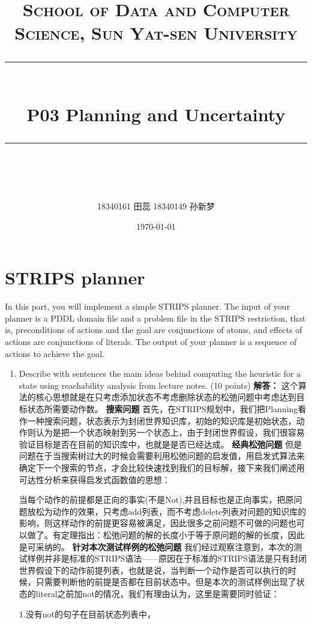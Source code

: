\documentclass[a4paper, 11pt]{article}
\title{	
\normalfont \normalsize
\textsc{School of Data and Computer Science, Sun Yat-sen University} \\ [25pt] %
\rule{\textwidth}{0.5pt} \\[0.4cm] %
\huge  P03 Planning and Uncertainty\\ %
\rule{\textwidth}{2pt} \\[0.5cm] %
\author{18340161 田蕊 18340149 孙新梦}
\date{\normalsize\today}
}
\begin{document}
\maketitle
\tableofcontents
\newpage
\section{STRIPS planner}
In this part, you will implement a simple STRIPS planner. The input of your planner is a PDDL domain file and a problem file in the STRIPS restriction, that is, preconditions of actions and the goal are conjunctions of atoms, and effects of actions are conjunctions of literals. The output of your planner is a sequence of actions to achieve the goal.

\begin{enumerate}

\item Describe with sentences the main ideas behind computing the heuristic for a state using reachability analysis from lecture notes. (10 points)
	\newline\textbf{解答：}
	这个算法的核心思想就是在只考虑添加状态不考虑删除状态的松弛问题中考虑达到目标状态所需要动作数。
	\newline\textbf{搜索问题}
    首先，在STRIPS规划中，我们把Planning看作一种搜索问题，状态表示为封闭世界知识库，初始的知识库是初始状态，动作则认为是把一个状态映射到另一个状态上，由于封闭世界假设，我们很容易验证目标是否在目前的知识库中，也就是是否已经达成。
    \newline\textbf{经典松弛问题}
    但是问题在于当搜索树过大的时候会需要利用松弛问题的启发值，用启发式算法来确定下一个搜索的节点，才会比较快速找到我们的目标解，接下来我们阐述用可达性分析来获得启发式函数值的思想：
    
    当每个动作的前提都是正向的事实(不是Not),并且目标也是正向事实，把原问题放松为动作的效果，只考虑add列表，而不考虑delete列表对问题的知识库的影响，则这样动作的前提更容易被满足，因此很多之前问题不可做的问题也可以做了。有定理指出：松弛问题的解的长度小于等于原问题的解的长度，因此是可采纳的。\newline
    \textbf{针对本次测试样例的松弛问题}
    我们经过观察注意到，本次的测试样例并非是标准的STRIPS语法——原因在于标准的STRIPS语法是只有封闭世界假设下的动作前提列表，也就是说，当判断一个动作是否可以执行的时候，只需要判断他的前提是否都在目前状态中。但是本次的测试样例出现了状态的literal之前加not的情况，我们有理由认为，这里是需要同时验证：
    
    	1.没有not的句子在目前状态列表中，
    	

\end{enumerate}
\end{document}
